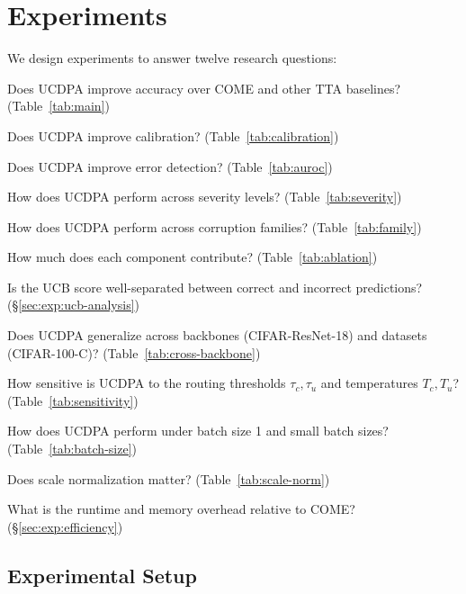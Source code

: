 \section{Experiments}
\label{sec:experiments}

We design experiments to answer twelve research questions:
\begin{description}[leftmargin=*,topsep=2pt,itemsep=2pt]
  \item[\textbf{Q1}] Does UCDPA improve accuracy over COME and other TTA baselines? (Table~\ref{tab:main})
  \item[\textbf{Q2}] Does UCDPA improve calibration? (Table~\ref{tab:calibration})
  \item[\textbf{Q3}] Does UCDPA improve error detection? (Table~\ref{tab:auroc})
  \item[\textbf{Q4}] How does UCDPA perform across severity levels? (Table~\ref{tab:severity})
  \item[\textbf{Q5}] How does UCDPA perform across corruption families? (Table~\ref{tab:family})
  \item[\textbf{Q6}] How much does each component contribute? (Table~\ref{tab:ablation})
  \item[\textbf{Q7}] Is the UCB score well-separated between correct and incorrect predictions? (\S\ref{sec:exp:ucb-analysis})
  \item[\textbf{Q8}] Does UCDPA generalize across backbones (CIFAR-ResNet-18) and datasets (CIFAR-100-C)? (Table~\ref{tab:cross-backbone})
  \item[\textbf{Q9}] How sensitive is UCDPA to the routing thresholds $\tau_c, \tau_u$ and temperatures $T_c, T_u$? (Table~\ref{tab:sensitivity})
  \item[\textbf{Q10}] How does UCDPA perform under batch size 1 and small batch sizes? (Table~\ref{tab:batch-size})
  \item[\textbf{Q11}] Does scale normalization matter? (Table~\ref{tab:scale-norm})
  \item[\textbf{Q12}] What is the runtime and memory overhead relative to COME? (\S\ref{sec:exp:efficiency})
\end{description}

\subsection{Experimental Setup}
\label{sec:exp:setup}

